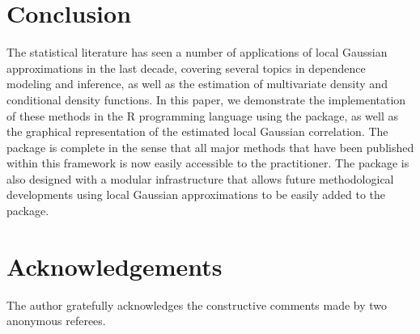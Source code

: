 \section{Conclusion} 

The statistical literature has seen a number of applications of local Gaussian approximations in the last decade, covering several topics in dependence modeling and inference, as well as the estimation of multivariate density and conditional density functions. In this paper, we demonstrate the implementation of these methods in the R programming language using the  package, as well as the graphical representation of the estimated local Gaussian correlation. The package is complete in the sense that all major methods that have been published within this framework is now easily accessible to the practitioner. The package is also designed with a modular infrastructure that allows future methodological developments using local Gaussian approximations to be easily added to the package. 

\section{Acknowledgements}

The author gratefully acknowledges the constructive comments made by two anonymous referees.



\address{H{\aa}kon Otneim\\
  Department of Business and Management Science, \\
  NHH Norwegian School of Economics, \\
  Helleveien 30, 5045 BERGEN\\
  Norway\\
  ORCID: 0000-0002-6004-0237\\
  }

